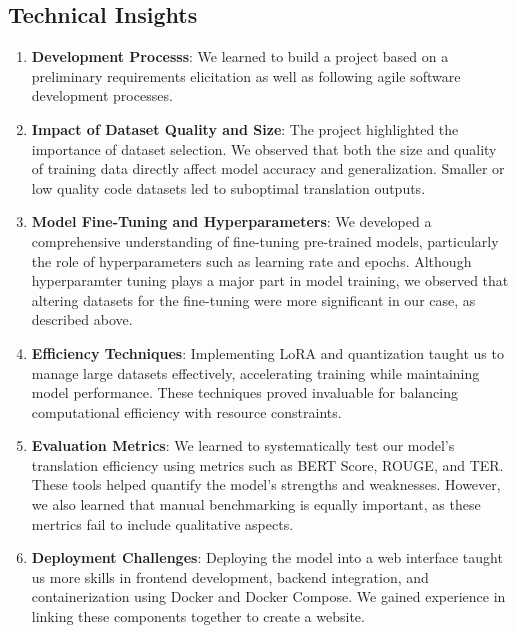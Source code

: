 \documentclass[conference]{IEEEtran}
\begin{document}
\subsection*{Technical Insights}
\begin{enumerate}

    \item \textbf{Development Processs}: We learned to build a project based on a preliminary requirements elicitation as well as following agile software development processes.

    \item \textbf{Impact of Dataset Quality and Size}: The project highlighted the importance of dataset selection. We observed that both the size and quality of training data directly affect model accuracy and generalization. Smaller or low quality code datasets led to suboptimal translation outputs.

    \item \textbf{Model Fine-Tuning and Hyperparameters}: We developed a comprehensive understanding of fine-tuning pre-trained models, particularly the role of hyperparameters such as learning rate and epochs. Although hyperparamter tuning plays a major part in model training, we observed that altering datasets for the fine-tuning were more significant in our case, as described above.
    
    \item \textbf{Efficiency Techniques}: Implementing LoRA and quantization taught us to manage large datasets effectively, accelerating training while maintaining model performance. These techniques proved invaluable for balancing computational efficiency with resource constraints.
    
    \item \textbf{Evaluation Metrics}: We learned to systematically test our model's translation efficiency using metrics such as BERT Score, ROUGE, and TER. These tools helped quantify the model's strengths and weaknesses. However, we also learned that manual benchmarking is equally important, as these mertrics fail to include qualitative aspects.
    
    \item \textbf{Deployment Challenges}: Deploying the model into a web interface taught us more skills in frontend development, backend integration, and containerization using Docker and Docker Compose. We gained experience in linking these components together to create a website.
\end{enumerate}
\end{document}
